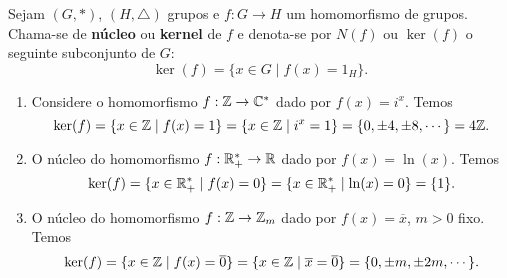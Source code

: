 \begin{definicao}
	Sejam $(G, *)$, $(H, \triangle)$ grupos e $f : G \to H$ um homomorfismo de grupos. Chama-se de \textbf{n\'ucleo} ou \textbf{kernel} de $f$ e denota-se por $N(f)$ ou $\ker(f)$ o seguinte subconjunto de $G$:
	\[
		\ker(f) = \{x \in G \mid f(x) = 1_H\}.
	\]
\end{definicao}

\begin{exemplos}
	\begin{enumerate}[label={\roman*})]
		\item Considere o homomorfismo $f : \mathbb{Z} \to \mathbb{C}^*$ dado por $f(x) = i^x$. Temos
		\[
			\ker(f) = \{x \in \mathbb{Z} \mid f(x) = 1\} = \{x \in \mathbb{Z} \mid i^x = 1\} = \{0, \pm 4, \pm 8, \cdots\} = 4\mathbb{Z}.
		\]

		\item O n\'ucleo do homomorfismo $f : \mathbb{R}^*_+ \to \mathbb{R}$ dado por $f(x) = \ln(x)$. Temos
		\[
			\ker(f) = \{x \in \mathbb{R}^*_+ \mid f(x) = 0\} = \{x \in \mathbb{R}^*_+ \mid \ln(x) = 0\} = \{1\}.
		\]

		\item O n\'ucleo do homomorfismo $f : \mathbb{Z} \to \mathbb{Z}_m$ dado por $f(x) = \overline{x}$, $m > 0$ fixo. Temos
		\[
			\ker(f) = \{x \in \mathbb{Z} \mid f(x) = \overline{0}\} = \{x \in \mathbb{Z} \mid \overline{x} = \overline{0}\} = \{0, \pm m, \pm 2m, \cdots\}.
		\]
	\end{enumerate}
\end{exemplos}

